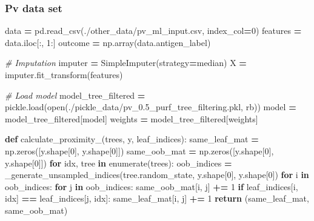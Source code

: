 \documentclass[
  11pt,
  oneside]{book}
\newenvironment{Shaded}{\begin{snugshade}}{\end{snugshade}}
\newcommand{\BuiltInTok}[1]{#1}
\newcommand{\CommentTok}[1]{\textcolor[rgb]{0.56,0.35,0.01}{\textit{#1}}}
\newcommand{\ControlFlowTok}[1]{\textcolor[rgb]{0.13,0.29,0.53}{\textbf{#1}}}
\newcommand{\DecValTok}[1]{\textcolor[rgb]{0.00,0.00,0.81}{#1}}
\newcommand{\KeywordTok}[1]{\textcolor[rgb]{0.13,0.29,0.53}{\textbf{#1}}}
\newcommand{\NormalTok}[1]{#1}
\newcommand{\OperatorTok}[1]{\textcolor[rgb]{0.81,0.36,0.00}{\textbf{#1}}}
\newcommand{\StringTok}[1]{\textcolor[rgb]{0.31,0.60,0.02}{#1}}
\begin{document}
\hypertarget{pv-data-set-3}{%
\subsubsection{Pv data set}\label{pv-data-set-3}}

\begin{Shaded}
\begin{Highlighting}[]
\NormalTok{data }\OperatorTok{=}\NormalTok{ pd.read\_csv(}\StringTok{\textquotesingle{}./other\_data/pv\_ml\_input.csv\textquotesingle{}}\NormalTok{, index\_col}\OperatorTok{=}\DecValTok{0}\NormalTok{)}
\NormalTok{features }\OperatorTok{=}\NormalTok{ data.iloc[:, }\DecValTok{1}\NormalTok{:]}
\NormalTok{outcome }\OperatorTok{=}\NormalTok{ np.array(data.antigen\_label)}

\CommentTok{\# Imputation}
\NormalTok{imputer }\OperatorTok{=}\NormalTok{ SimpleImputer(strategy}\OperatorTok{=}\StringTok{\textquotesingle{}median\textquotesingle{}}\NormalTok{)}
\NormalTok{X }\OperatorTok{=}\NormalTok{ imputer.fit\_transform(features)}

\CommentTok{\# Load model}
\NormalTok{model\_tree\_filtered }\OperatorTok{=}\NormalTok{ pickle.load(}\BuiltInTok{open}\NormalTok{(}\StringTok{\textquotesingle{}./pickle\_data/pv\_0.5\_purf\_tree\_filtering.pkl\textquotesingle{}}\NormalTok{, }\StringTok{\textquotesingle{}rb\textquotesingle{}}\NormalTok{))}
\NormalTok{model }\OperatorTok{=}\NormalTok{ model\_tree\_filtered[}\StringTok{\textquotesingle{}model\textquotesingle{}}\NormalTok{]}
\NormalTok{weights }\OperatorTok{=}\NormalTok{ model\_tree\_filtered[}\StringTok{\textquotesingle{}weights\textquotesingle{}}\NormalTok{]}

\KeywordTok{def}\NormalTok{ calculate\_proximity\_(trees, y, leaf\_indices):}
\NormalTok{    same\_leaf\_mat }\OperatorTok{=}\NormalTok{ np.zeros([y.shape[}\DecValTok{0}\NormalTok{], y.shape[}\DecValTok{0}\NormalTok{]])}
\NormalTok{    same\_oob\_mat }\OperatorTok{=}\NormalTok{ np.zeros([y.shape[}\DecValTok{0}\NormalTok{], y.shape[}\DecValTok{0}\NormalTok{]])}
    \ControlFlowTok{for}\NormalTok{ idx, tree }\KeywordTok{in} \BuiltInTok{enumerate}\NormalTok{(trees):}
\NormalTok{        oob\_indices }\OperatorTok{=}\NormalTok{ \_generate\_unsampled\_indices(tree.random\_state, y.shape[}\DecValTok{0}\NormalTok{], y.shape[}\DecValTok{0}\NormalTok{])}
        \ControlFlowTok{for}\NormalTok{ i }\KeywordTok{in}\NormalTok{ oob\_indices:}
            \ControlFlowTok{for}\NormalTok{ j }\KeywordTok{in}\NormalTok{ oob\_indices:}
\NormalTok{                same\_oob\_mat[i, j] }\OperatorTok{+=} \DecValTok{1}
                \ControlFlowTok{if}\NormalTok{ leaf\_indices[i, idx] }\OperatorTok{==}\NormalTok{ leaf\_indices[j, idx]:}
\NormalTok{                    same\_leaf\_mat[i, j] }\OperatorTok{+=} \DecValTok{1}
    \ControlFlowTok{return}\NormalTok{ (same\_leaf\_mat, same\_oob\_mat)}


\end{Highlighting}
\end{Shaded}
\end{document}
